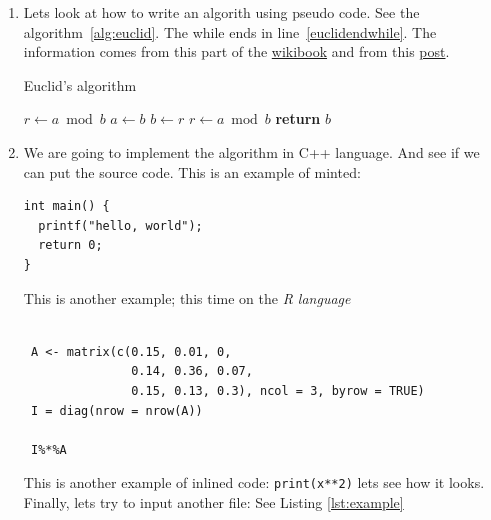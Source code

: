 \begin{enumerate}
\item Lets look at how to write an algorith using pseudo code. See the algorithm~\ref{alg:euclid}. The while ends in line~\ref{euclidendwhile}. The information comes from this part of the \href{https://en.wikibooks.org/wiki/LaTeX/Algorithms#Typesetting_using_the_algorithmicx_package}{wikibook} and from this \href{https://tex.stackexchange.com/questions/229355/algorithm-algorithmic-algorithmicx-algorithm2e-algpseudocode-confused}{post}.

\begin{algorithm}
  \caption{Euclid's algorithm}
  \label{alg:euclid}
  \begin{algorithmic}[1] %
     
      \State $r\gets a \bmod b$
       
        \State $a \gets b$
        \State $b \gets r$
        \State $r \gets a \bmod b$
      \EndWhile\label{euclidendwhile}
      \State \textbf{return} $b$
    \EndProcedure
  \end{algorithmic}
\end{algorithm}

\item We are going to implement the algorithm in C++ language. And see if we can put the source code. This is an example of minted:
\begin{verbatim}
int main() {
  printf("hello, world");
  return 0;
}
\end{verbatim}

This is another example; this time on the \emph{R language}

\begin{verbatim}

 A <- matrix(c(0.15, 0.01, 0,
               0.14, 0.36, 0.07,
               0.15, 0.13, 0.3), ncol = 3, byrow = TRUE)
 I = diag(nrow = nrow(A))

 I%*%A
\end{verbatim}

This is another example of inlined code: \texttt{print(x**2)} lets see how it looks. Finally, lets try to input another file: See Listing \ref{lst:example} 

\end{enumerate}
